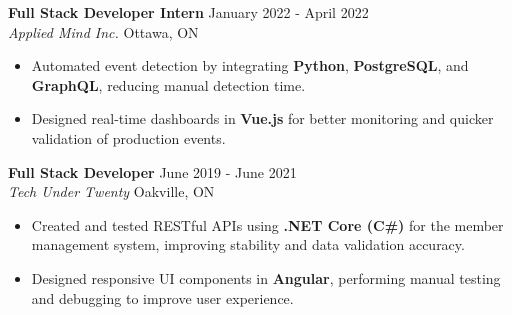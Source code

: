 \documentclass[a4paper]{article}
\newcommand{\lineunder} {
    \vspace*{-8pt} \\
    \hspace*{-18pt} \hrulefill \\
}
\newcommand{\header} [1] {
    {\hspace*{-18pt}\vspace*{6pt} \textsc{#1}}
    \vspace*{-6pt} \lineunder
}
\begin{document}
\textbf{Full Stack Developer Intern} \hfill January 2022 - April 2022\\
\textit{Applied Mind Inc.} \hfill Ottawa, ON\\
\vspace{-2mm}
\begin{itemize} \itemsep -2pt
    \item Automated event detection by integrating \textbf{Python}, \textbf{PostgreSQL}, and \textbf{GraphQL}, reducing manual detection time.
    \item Designed real-time dashboards in \textbf{Vue.js} for better monitoring and quicker validation of production events.
\end{itemize}

\textbf{Full Stack Developer} \hfill June 2019 - June 2021\\
\textit{Tech Under Twenty} \hfill Oakville, ON\\
\vspace{-2mm}
\begin{itemize} \itemsep -2pt
    \item Created and tested RESTful APIs using \textbf{.NET Core (C\#)} for the member management system, improving stability and data validation accuracy.
    \item Designed responsive UI components in \textbf{Angular}, performing manual testing and debugging to improve user experience.
\end{itemize}


\end{document}
